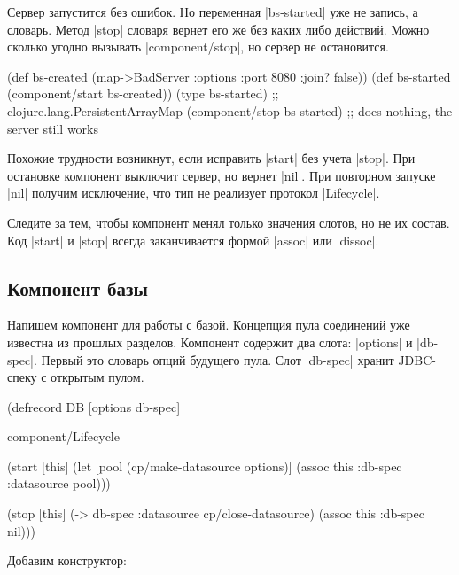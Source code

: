 
Сервер запустится без ошибок. Но переменная \spverb|bs-started| уже не запись, а
словарь. Метод \spverb|stop| словаря вернет его же без каких либо
действий. Можно сколько угодно вызывать \spverb|component/stop|, но сервер не
остановится.

\begin{english}
  \begin{clojure}
(def bs-created (map->BadServer {:options {:port 8080 :join? false}}))
(def bs-started (component/start bs-created))
(type bs-started)
;; clojure.lang.PersistentArrayMap
(component/stop bs-started)
;; does nothing, the server still works
  \end{clojure}
\end{english}

Похожие трудности возникнут, если исправить \spverb|start| без учета
\spverb|stop|. При остановке компонент выключит сервер, но вернет
\spverb|nil|. При повторном запуске \spverb|nil| получим исключение, что тип не
реализует протокол \spverb|Lifecycle|.

Следите за тем, чтобы компонент менял только значения слотов, но не их
состав. Код \spverb|start| и \spverb|stop| всегда заканчивается формой
\spverb|assoc| или \spverb|dissoc|.

\subsection{Компонент базы}

Напишем компонент для работы с базой. Концепция пула соединений уже известна из
прошлых разделов. Компонент содержит два слота: \spverb|options| и
\spverb|db-spec|. Первый это словарь опций будущего пула. Слот \spverb|db-spec|
хранит JDBC-спеку с открытым пулом.

\begin{english}
  \begin{clojure}
(defrecord DB
    [options db-spec]

  component/Lifecycle

  (start [this]
    (let [pool (cp/make-datasource options)]
      (assoc this :db-spec {:datasource pool})))

  (stop [this]
    (-> db-spec :datasource cp/close-datasource)
    (assoc this :db-spec nil)))
  \end{clojure}
\end{english}

Добавим конструктор:

